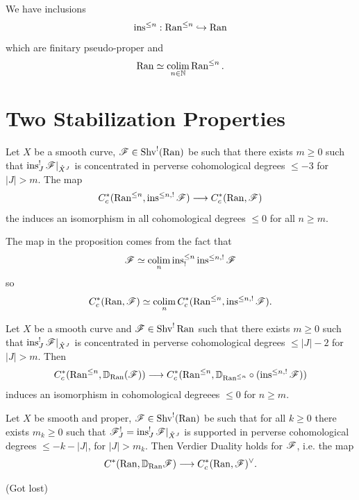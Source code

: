 \documentclass[oneside]{amsart}
\begin{document}
We have inclusions
\[
\operatorname{ins}^{\le n}:\operatorname{Ran}^{\le n}\hookrightarrow \operatorname{Ran}
\] 
which are finitary pseudo-proper and
\[
\operatorname{Ran} \simeq \operatorname*{colim}_{n\in \mathbb N}\operatorname{Ran}^{\le n}.
\] 

\section{Two Stabilization Properties}
\begin{proposition}
	Let $X$ be a smooth curve, $\mathscr{F}\in \operatorname{Shv}^{!}(\operatorname{Ran})$ be such that there exists $m\ge 0$ such that $\operatorname{ins}_J^{!}\mathscr{F}|_{\mathring{X}^{J}}$ is concentrated in perverse cohomological degrees $\le -3$ for $|J| > m$. The map
	\[
		C^{*}_c(\Ran^{\le n},\ins^{\le n,!}\CF) \to C^{*}_c(\Ran,\CF)
	\] 
	the induces an isomorphism in all cohomological degrees $\le 0$ for all $n\ge m$.
\end{proposition}
The map in the proposition comes from the fact that
\[
\mathscr{F} \simeq \operatorname*{colim}_n \operatorname{ins}^{\le n}_!\operatorname{ins}^{\le n,!}\mathscr{F}
\] 
so
\[
C_c^{*}(\operatorname{Ran},\mathscr{F}) \simeq \operatorname*{colim}_{n}C_c^{*}(\operatorname{Ran}^{\le n},\operatorname{ins}^{\le n,!}\mathscr{F}).
\] 

\begin{proposition}
	Let $X$ be a smooth curve and $\mathscr{F}\in \operatorname{Shv}^{!}\operatorname{Ran}$ such that there exists $m\ge 0$ such that $\operatorname{ins}_J^{!}\mathscr{F}|_{\mathring{X}^{J}}$ is concentrated in perverse cohomological degrees $\le |J|-2$ for $|J|>m$. Then
	\[
	C^{*}_c(\Ran^{\le n},\VD_{\Ran}(\CF)) \to C^{*}_c(\Ran^{\le n},\VD_{\Ran^{\le n}}\circ(\ins^{\le n,!}\CF))
	\] 
	induces an isomorphism in cohomological degreees $\le 0$ for $n\ge m$.
\end{proposition}

\begin{theorem}
	Let $X$ be smooth and proper, $\mathscr{F}\in \operatorname{Shv}^{!}(\operatorname{Ran})$ be such that for all $k\ge 0$ there exists $m_k\ge 0$ such that $\mathscr{F}^{!}_J=\operatorname{ins}_J^{!}\mathscr{F}|_{\mathring{X}^{J}}$ is supported in perverse cohomological degrees $\le -k-|J|$, for $|J|>m_k$. Then Verdier Duality holds for $\mathscr{F}$, i.e. the map
	\[
	C^{*}(\Ran,\VD_{\Ran}\CF) \to C_c^{*}(\Ran,\CF)^{\vee}.
	\] 
\end{theorem}
(Got lost)
\end{document}
